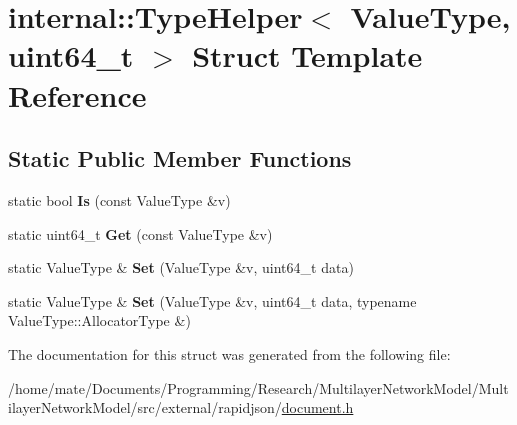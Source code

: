\hypertarget{structinternal_1_1TypeHelper_3_01ValueType_00_01uint64__t_01_4}{}\section{internal\+:\+:Type\+Helper$<$ Value\+Type, uint64\+\_\+t $>$ Struct Template Reference}
\label{structinternal_1_1TypeHelper_3_01ValueType_00_01uint64__t_01_4}
\subsection*{Static Public Member Functions}
\begin{DoxyCompactItemize}
\item 
static bool {\bfseries Is} (const Value\+Type \&v)\hypertarget{structinternal_1_1TypeHelper_3_01ValueType_00_01uint64__t_01_4_a4916651732ed27fa944c96a32cec5b88}{}\label{structinternal_1_1TypeHelper_3_01ValueType_00_01uint64__t_01_4_a4916651732ed27fa944c96a32cec5b88}

\item 
static uint64\+\_\+t {\bfseries Get} (const Value\+Type \&v)\hypertarget{structinternal_1_1TypeHelper_3_01ValueType_00_01uint64__t_01_4_a1b1b2e4fe3c38fb37701284c6571ee92}{}\label{structinternal_1_1TypeHelper_3_01ValueType_00_01uint64__t_01_4_a1b1b2e4fe3c38fb37701284c6571ee92}

\item 
static Value\+Type \& {\bfseries Set} (Value\+Type \&v, uint64\+\_\+t data)\hypertarget{structinternal_1_1TypeHelper_3_01ValueType_00_01uint64__t_01_4_a38392035fe5a647078b24f0e15a84145}{}\label{structinternal_1_1TypeHelper_3_01ValueType_00_01uint64__t_01_4_a38392035fe5a647078b24f0e15a84145}

\item 
static Value\+Type \& {\bfseries Set} (Value\+Type \&v, uint64\+\_\+t data, typename Value\+Type\+::\+Allocator\+Type \&)\hypertarget{structinternal_1_1TypeHelper_3_01ValueType_00_01uint64__t_01_4_a3c8b01c3e9a9e63c99bef2db9fdf3823}{}\label{structinternal_1_1TypeHelper_3_01ValueType_00_01uint64__t_01_4_a3c8b01c3e9a9e63c99bef2db9fdf3823}

\end{DoxyCompactItemize}


The documentation for this struct was generated from the following file\+:\begin{DoxyCompactItemize}
\item 
/home/mate/\+Documents/\+Programming/\+Research/\+Multilayer\+Network\+Model/\+Multilayer\+Network\+Model/src/external/rapidjson/\hyperlink{document_8h}{document.\+h}\end{DoxyCompactItemize}
